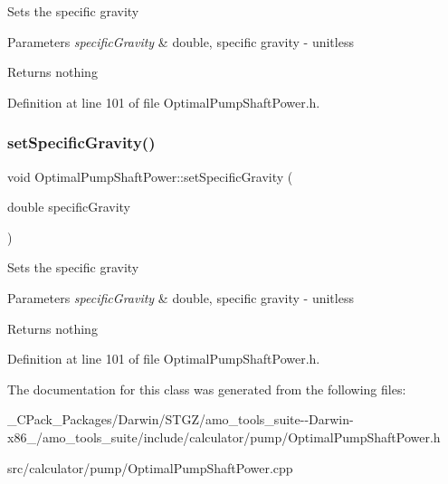 Sets the specific gravity


\begin{DoxyParams}{Parameters}
{\em specific\+Gravity} & double, specific gravity -\/ unitless\\
\hline
\end{DoxyParams}
\begin{DoxyReturn}{Returns}
nothing 
\end{DoxyReturn}


Definition at line 101 of file Optimal\+Pump\+Shaft\+Power.\+h.

\mbox{\label{class_optimal_pump_shaft_power_aa565a332e4b144c8eb85fd06c541199e}} 
\subsubsection{\texorpdfstring{set\+Specific\+Gravity()}{setSpecificGravity()}\hspace{0.1cm}{\footnotesize\ttfamily [3/3]}}
{\footnotesize\ttfamily void Optimal\+Pump\+Shaft\+Power\+::set\+Specific\+Gravity (\begin{DoxyParamCaption}\item[{double}]{specific\+Gravity }\end{DoxyParamCaption})\hspace{0.3cm}{\ttfamily [inline]}}

Sets the specific gravity


\begin{DoxyParams}{Parameters}
{\em specific\+Gravity} & double, specific gravity -\/ unitless\\
\hline
\end{DoxyParams}
\begin{DoxyReturn}{Returns}
nothing 
\end{DoxyReturn}


Definition at line 101 of file Optimal\+Pump\+Shaft\+Power.\+h.



The documentation for this class was generated from the following files\+:\begin{DoxyCompactItemize}
\item 
\+\_\+\+C\+Pack\+\_\+\+Packages/\+Darwin/\+S\+T\+G\+Z/amo\+\_\+tools\+\_\+suite-\/-\/\+Darwin-\/x86\+\_/amo\+\_\+tools\+\_\+suite/include/calculator/pump/Optimal\+Pump\+Shaft\+Power.\+h\item 
src/calculator/pump/Optimal\+Pump\+Shaft\+Power.\+cpp\end{DoxyCompactItemize}

